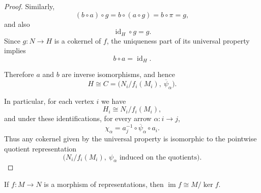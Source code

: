 \documentclass[11pt, a4paper]{report}
\begin{document}
\begin{proof}
    Similarly,
    \[
        (b\circ a)\circ g
        =b\circ (a\circ g)
        =b\circ \pi
        =g,
    \]
    and also
    \[
        \operatorname{id}_H\circ g=g.
    \]
    Since $g:N\to H$ is a cokernel of $f$, the uniqueness part of its universal property implies
    \[
        b\circ a=\operatorname{id}_H.
    \]

    Therefore $a$ and $b$ are inverse isomorphisms, and hence
    \[
        H\cong C=\bigl(N_i/f_i(M_i),\ \overline{\psi}_\alpha\bigr).
    \]

    In particular, for each vertex $i$ we have
    \[
        H_i\cong N_i/f_i(M_i),
    \]
    and under these identifications, for every arrow $\alpha:i\to j$,
    \[
        \chi_\alpha
        =
        a_j^{-1}\circ \overline{\psi}_\alpha\circ a_i.
    \]
    Thus any cokernel given by the universal property is isomorphic to the pointwise quotient representation
    \[
        \bigl(N_i/f_i(M_i),\ \psi_\alpha \text{ induced on the quotients}\bigr).
    \]
\end{proof}



\begin{theorem}
    If $f: M\to N$ is a morphism of representations, then $\operatorname{im}f \cong M/\operatorname{ker}f$.
\end{theorem}
\end{document}
